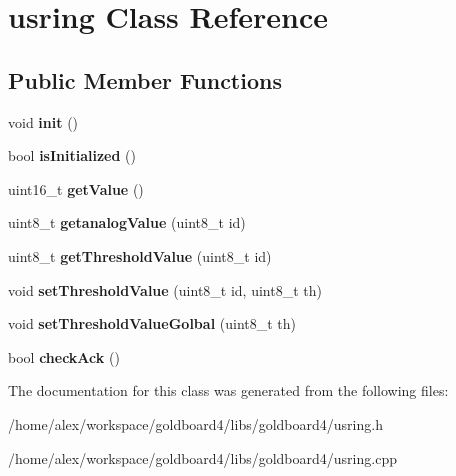 \hypertarget{classusring}{}\section{usring Class Reference}
\label{classusring}
\subsection*{Public Member Functions}
\begin{DoxyCompactItemize}
\item 
void {\bfseries init} ()\hypertarget{classusring_a321d443eba1e0d0a8d934ed2bd2b62ef}{}\label{classusring_a321d443eba1e0d0a8d934ed2bd2b62ef}

\item 
bool {\bfseries is\+Initialized} ()\hypertarget{classusring_a88b48bd55933924d38f2c2ea0956d529}{}\label{classusring_a88b48bd55933924d38f2c2ea0956d529}

\item 
uint16\+\_\+t {\bfseries get\+Value} ()\hypertarget{classusring_aef8cbedfd02e29767ed71a8da45938a1}{}\label{classusring_aef8cbedfd02e29767ed71a8da45938a1}

\item 
uint8\+\_\+t {\bfseries getanalog\+Value} (uint8\+\_\+t id)\hypertarget{classusring_a79e46727af047f6d2181173f68daae3c}{}\label{classusring_a79e46727af047f6d2181173f68daae3c}

\item 
uint8\+\_\+t {\bfseries get\+Threshold\+Value} (uint8\+\_\+t id)\hypertarget{classusring_a230d462e28252d2029cc70e40d6289fd}{}\label{classusring_a230d462e28252d2029cc70e40d6289fd}

\item 
void {\bfseries set\+Threshold\+Value} (uint8\+\_\+t id, uint8\+\_\+t th)\hypertarget{classusring_a0498d60f7e7908b132968deca273dbf0}{}\label{classusring_a0498d60f7e7908b132968deca273dbf0}

\item 
void {\bfseries set\+Threshold\+Value\+Golbal} (uint8\+\_\+t th)\hypertarget{classusring_a67e0e2972434462c28b9abfbe44da941}{}\label{classusring_a67e0e2972434462c28b9abfbe44da941}

\item 
bool {\bfseries check\+Ack} ()\hypertarget{classusring_abc14d72023af94ffdba22b101a5d9152}{}\label{classusring_abc14d72023af94ffdba22b101a5d9152}

\end{DoxyCompactItemize}


The documentation for this class was generated from the following files\+:\begin{DoxyCompactItemize}
\item 
/home/alex/workspace/goldboard4/libs/goldboard4/usring.\+h\item 
/home/alex/workspace/goldboard4/libs/goldboard4/usring.\+cpp\end{DoxyCompactItemize}

